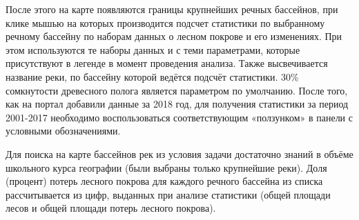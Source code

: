 После этого на карте появляются границы крупнейших речных бассейнов, при клике мышью на которых производится подсчет статистики по выбранному речному бассейну по наборам данных о лесном покрове и его изменениях. При этом используются те наборы данных и с теми параметрами, которые присутствуют в легенде в момент проведения анализа. Также высвечивается название реки, по бассейну которой ведётся подсчёт статистики. 30\% сомкнутости древесного полога является параметром по умолчанию. После того, как на портал добавили данные за 2018 год, для получения статистики за период 2001-2017 необходимо воспользоваться соответствующим «ползунком» в панели с условными обозначениями.

Для поиска на карте бассейнов рек из условия задачи достаточно знаний в объёме школьного курса географии (были выбраны только крупнейшие реки). Доля (процент) потерь лесного покрова для каждого речного бассейна из списка рассчитывается из цифр, выданных при анализе статистики (общей площади лесов и общей площади потерь лесного покрова).


